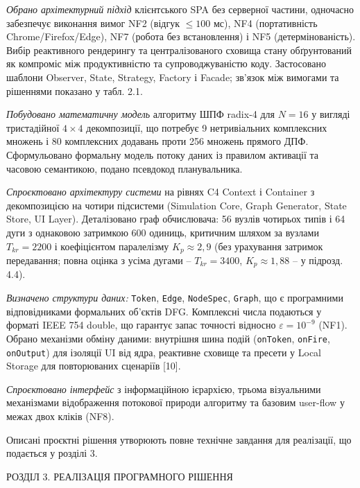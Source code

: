\documentclass[
]{article}
\newcommand{\passthrough}[1]{#1}
\begin{document}
\emph{Обрано архітектурний підхід} клієнтського SPA без серверної
частини, одночасно забезпечує виконання вимог NF2 (відгук \(\leq 100\)
мс), NF4 (портативність Chrome/Firefox/Edge), NF7 (робота без
встановлення) і NF5 (детермінованість). Вибір реактивного рендерингу та
централізованого сховища стану обґрунтований як компроміс між
продуктивністю та супроводжуваністю коду. Застосовано шаблони Observer,
State, Strategy, Factory і Facade; зв'язок між вимогами та рішеннями
показано у табл. 2.1.

\emph{Побудовано математичну модель} алгоритму ШПФ radix-4 для
\(N = 16\) у вигляді тристадійної \(4 \times 4\) декомпозиції, що
потребує 9 нетривіальних комплексних множень і 80 комплексних додавань
проти 256 множень прямого ДПФ. Сформульовано формальну модель потоку
даних із правилом активації та часовою семантикою, подано псевдокод
планувальника.

\emph{Спроєктовано архітектуру системи} на рівнях C4 Context і Container
з декомпозицією на чотири підсистеми (Simulation Core, Graph Generator,
State Store, UI Layer). Деталізовано граф обчислювача: 56 вузлів
чотирьох типів і 64 дуги з однаковою затримкою 600 одиниць, критичним
шляхом за вузлами \(T_{kr} = 2200\) і коефіцієнтом паралелізму
\(K_{p} \approx 2,9\) (без урахування затримок передавання; повна оцінка
з усіма дугами -- \(T_{kr} = 3400\), \(K_{p} \approx 1,88\) -- у
підрозд. 4.4).

\emph{Визначено структури даних:} \passthrough{\lstinline!Token!},
\passthrough{\lstinline!Edge!}, \passthrough{\lstinline!NodeSpec!},
\passthrough{\lstinline!Graph!}, що є програмними відповідниками
формальних об'єктів DFG. Комплексні числа подаються у форматі IEEE 754
double, що гарантує запас точності відносно \(\varepsilon = 10^{- 9}\)
(NF1). Обрано механізми обміну даними: внутрішня шина подій
(\passthrough{\lstinline!onToken!}, \passthrough{\lstinline!onFire!},
\passthrough{\lstinline!onOutput!}) для ізоляції UI від ядра, реактивне
сховище та пресети у Local Storage для повторюваних сценаріїв {[}10{]}.

\emph{Спроєктовано інтерфейс} з інформаційною ієрархією, трьома
візуальними механізмами відображення потокової природи алгоритму та
базовим user-flow у межах двох кліків (NF8).

Описані проєктні рішення утворюють повне технічне завдання для
реалізації, що подається у розділі 3.

\protect{}\label{Xb318da8362366e318c175a774743ed9d944e7a3}{}РОЗДІЛ
3. РЕАЛІЗАЦІЯ ПРОГРАМНОГО РІШЕННЯ
\end{document}

